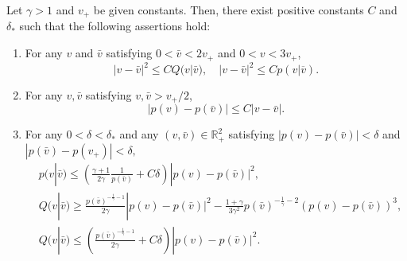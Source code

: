 \documentclass[11pt,reqno]{amsart}
\begin{document}
    \begin{lemma}[\cite{KV21}]\label{lem : Estimate-relative} Let $\gamma>1$ and $v_+$ be given constants. Then, there exist positive constants $C$ and $\delta_*$ such that the following assertions hold:
        \begin{enumerate}
            \item For any $v$ and $\bar{v}$ satisfying $0<\bar{v}<2v_+$ and $0<v<3v_+$,
            \begin{equation*}
            |v-\bar{v}|^2 \le C Q(v|\bar{v}), \quad |v-\bar{v}|^2 \le C p(v|\overline{v}).
            \end{equation*}
            \item For any $v,\bar{v}$ satisfying $v,\bar{v} > v_+ /2$,
            \begin{equation*}
            |p(v)-p(\bar{v})| \le C |v-\bar{v}|.
            \end{equation*}
            \item For any $0<\delta<\delta_*$ and any $(v,\bar{v}) \in \mathbb{R}^2_+$ satisfying $|p(v)-p(\bar{v})|<\delta$ and $|p(\bar{v})-p(v_+)| < \delta,$
            \begin{equation*}
            \begin{aligned}
            &p(v|\bar{v}) \le \left( \frac{\gamma +1 }{2 \gamma } \frac{1}{p(\bar{v})} +C \delta \right) |p(v)-p(\bar{v})|^2,\\ 
            &Q(v|\bar{v}) \ge \frac{p(\bar{v})^{- \frac{1}{\gamma}-1}}{2 \gamma}|p(v)-p(\bar{v})|^2- \frac{1+\gamma}{3\gamma^2}p(\bar{v})^{- \frac{1}{\gamma}-2}(p(v)-p(\bar{v}))^3,\\ 
            &Q(v|\bar{v}) \le \left( \frac{p(\bar{v})^{- \frac{1}{\gamma}-1}}{2 \gamma} +C \delta \right)|p(v)-p(\bar{v})|^2.
            \end{aligned}
            \end{equation*}
            
        \end{enumerate} 
    \end{lemma}
    
\end{document}
